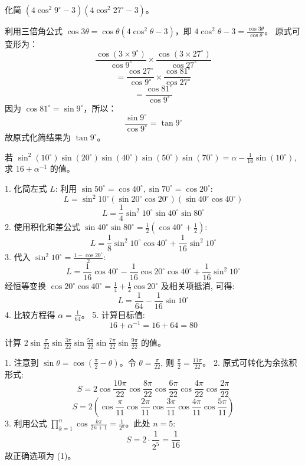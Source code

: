 \begin{questions}
    \question 化简 $(4 \cos^2 9^\circ - 3)(4 \cos^2 27^\circ - 3)$。

\begin{solution}
利用三倍角公式 $\cos 3\theta = \cos \theta (4 \cos^2 \theta - 3)$，即 $4 \cos^2 \theta - 3 = \frac{\cos 3\theta}{\cos \theta}$。
原式可变形为：
\[
\frac{\cos (3 \times 9^\circ)}{\cos 9^\circ} \times \frac{\cos (3 \times 27^\circ)}{\cos 27^\circ}
\]
\[
= \frac{\cos 27^\circ}{\cos 9^\circ} \times \frac{\cos 81^\circ}{\cos 27^\circ}
\]
\[
= \frac{\cos 81^\circ}{\cos 9^\circ}
\]
因为 $\cos 81^\circ = \sin 9^\circ$，所以：
\[
\frac{\sin 9^\circ}{\cos 9^\circ} = \tan 9^\circ
\]
故原式化简结果为 $\tan 9^\circ$。
\end{solution}

\question
若 $\sin^2(10^\circ) \sin(20^\circ) \sin(40^\circ) \sin(50^\circ) \sin(70^\circ) = \alpha - \frac{1}{16}\sin(10^\circ)$, 求 $16 + \alpha^{-1}$ 的值。

\begin{solution}
1. 化简左式 $L$:
利用 $\sin 50^\circ = \cos 40^\circ, \sin 70^\circ = \cos 20^\circ$:
\[ L = \sin^2 10^\circ (\sin 20^\circ \cos 20^\circ) (\sin 40^\circ \cos 40^\circ) \]
\[ L = \frac{1}{4} \sin^2 10^\circ \sin 40^\circ \sin 80^\circ \]
2. 使用积化和差公式 $\sin 40^\circ \sin 80^\circ = \frac{1}{2}(\cos 40^\circ + \frac{1}{2})$:
\[ L = \frac{1}{8} \sin^2 10^\circ \cos 40^\circ + \frac{1}{16} \sin^2 10^\circ \]
3. 代入 $\sin^2 10^\circ = \frac{1 - \cos 20^\circ}{2}$:
\[ L = \frac{1}{16} \cos 40^\circ - \frac{1}{16} \cos 20^\circ \cos 40^\circ + \frac{1}{16} \sin^2 10^\circ \]
经恒等变换 $\cos 20^\circ \cos 40^\circ = \frac{1}{4} + \frac{1}{2} \cos 20^\circ$ 及相关项抵消, 可得:
\[ L = \frac{1}{64} - \frac{1}{16} \sin 10^\circ \]
4. 比较方程得 $\alpha = \frac{1}{64}$。
5. 计算目标值:
\[ 16 + \alpha^{-1} = 16 + 64 = 80 \]
\end{solution}

\question
计算 $2 \sin \frac{\pi}{22} \sin \frac{3\pi}{22} \sin \frac{5\pi}{22} \sin \frac{7\pi}{22} \sin \frac{9\pi}{22}$ 的值。

\begin{solution}
1. 注意到 $\sin \theta = \cos(\frac{\pi}{2} - \theta)$。令 $\theta = \frac{\pi}{22}$, 则 $\frac{\pi}{2} = \frac{11\pi}{22}$。
2. 原式可转化为余弦积形式:
\[ S = 2 \cos \frac{10\pi}{22} \cos \frac{8\pi}{22} \cos \frac{6\pi}{22} \cos \frac{4\pi}{22} \cos \frac{2\pi}{22} \]
\[ S = 2 \left( \cos \frac{\pi}{11} \cos \frac{2\pi}{11} \cos \frac{3\pi}{11} \cos \frac{4\pi}{11} \cos \frac{5\pi}{11} \right) \]
3. 利用公式 $\prod_{k=1}^n \cos \frac{k\pi}{2n+1} = \frac{1}{2^n}$。此处 $n=5$:
\[ S = 2 \cdot \frac{1}{2^5} = \frac{1}{16} \]
故正确选项为 (1)。
\end{solution}


\end{questions}
